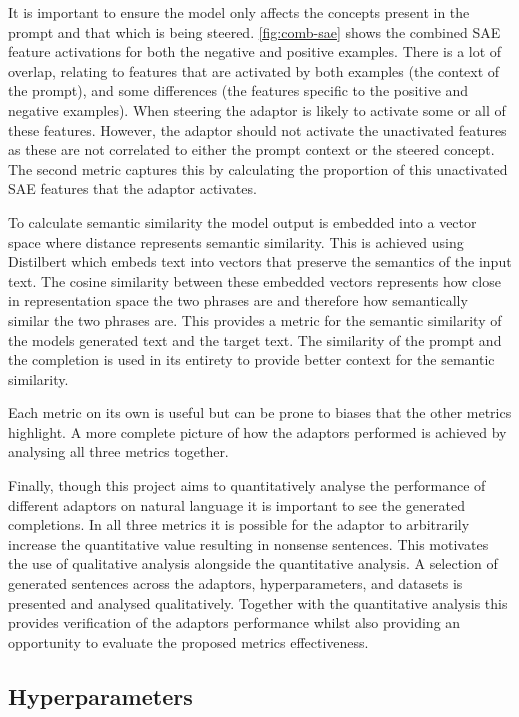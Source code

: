 It is important to ensure the model only affects the concepts present in the prompt and that which is being steered.
\cref{fig:comb-sae} shows the combined SAE feature activations for both the negative and positive examples.
There is a lot of overlap, relating to features that are activated by both examples (the context of the prompt), and some differences (the features specific to the positive and negative examples).
When steering the adaptor is likely to activate some or all of these features.
However, the adaptor should not activate the unactivated features as these are not correlated to either the prompt context or the steered concept.
The second metric captures this by calculating the proportion of this unactivated SAE features that the adaptor activates.

To calculate semantic similarity the model output is embedded into a vector space where distance represents semantic similarity.
This is achieved using Distilbert \citep{distilbert} which embeds text into vectors that preserve the semantics of the input text.
The cosine similarity between these embedded vectors represents how close in representation space the two phrases are and therefore how semantically similar the two phrases are.
This provides a metric for the semantic similarity of the models generated text and the target text.
The similarity of the prompt and the completion is used in its entirety to provide better context for the semantic similarity.

Each metric on its own is useful but can be prone to biases that the other metrics highlight.
A more complete picture of how the adaptors performed is achieved by analysing all three metrics together.

Finally, though this project aims to quantitatively analyse the performance of different adaptors on natural language it is important to see the generated completions.
In all three metrics it is possible for the adaptor to arbitrarily increase the quantitative value resulting in nonsense sentences.
This motivates the use of qualitative analysis alongside the quantitative analysis.
A selection of generated sentences across the adaptors, hyperparameters, and datasets is presented and analysed qualitatively.
Together with the quantitative analysis this provides verification of the adaptors performance whilst also providing an opportunity to evaluate the proposed metrics effectiveness.

\subsection{Hyperparameters}

